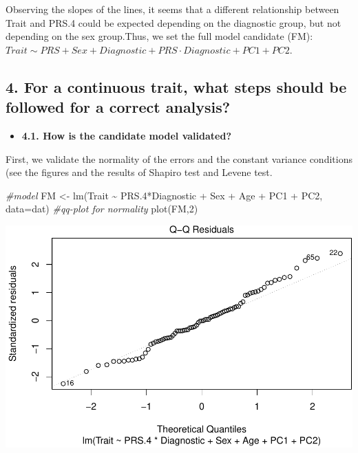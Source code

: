 \documentclass[
]{article}
\newenvironment{Shaded}{\begin{snugshade}}{\end{snugshade}}
\newcommand{\AttributeTok}[1]{\textcolor[rgb]{0.77,0.63,0.00}{#1}}
\newcommand{\CommentTok}[1]{\textcolor[rgb]{0.56,0.35,0.01}{\textit{#1}}}
\newcommand{\DecValTok}[1]{\textcolor[rgb]{0.00,0.00,0.81}{#1}}
\newcommand{\FloatTok}[1]{\textcolor[rgb]{0.00,0.00,0.81}{#1}}
\newcommand{\FunctionTok}[1]{\textcolor[rgb]{0.00,0.00,0.00}{#1}}
\newcommand{\NormalTok}[1]{#1}
\newcommand{\OtherTok}[1]{\textcolor[rgb]{0.56,0.35,0.01}{#1}}
\newcommand{\SpecialCharTok}[1]{\textcolor[rgb]{0.00,0.00,0.00}{#1}}
\providecommand{\tightlist}{%
  \setlength{\itemsep}{0pt}\setlength{\parskip}{0pt}}
\begin{document}
Observing the slopes of the lines, it seems that a different
relationship between Trait and PRS.4 could be expected depending on the
diagnostic group, but not depending on the sex group.Thus, we set the
full model candidate (FM):
\(Trait \sim PRS + Sex + Diagnostic + PRS\cdot Diagnostic + PC1 +PC2\).

\hypertarget{for-a-continuous-trait-what-steps-should-be-followed-for-a-correct-analysis}{%
\subsection{4. For a continuous trait, what steps should be followed for
a correct
analysis?}\label{for-a-continuous-trait-what-steps-should-be-followed-for-a-correct-analysis}}

\begin{itemize}
\tightlist
\item
  \textbf{4.1. How is the candidate model validated?}
\end{itemize}

First, we validate the normality of the errors and the constant variance
conditions (see the figures and the results of Shapiro test and Levene
test.

\begin{Shaded}
\begin{Highlighting}[]
\CommentTok{\#model}
\NormalTok{FM }\OtherTok{\textless{}{-}} \FunctionTok{lm}\NormalTok{(Trait }\SpecialCharTok{\textasciitilde{}}\NormalTok{ PRS}\FloatTok{.4}\SpecialCharTok{*}\NormalTok{Diagnostic }\SpecialCharTok{+}\NormalTok{ Sex }\SpecialCharTok{+}\NormalTok{ Age }\SpecialCharTok{+}\NormalTok{ PC1 }\SpecialCharTok{+}\NormalTok{ PC2, }\AttributeTok{data=}\NormalTok{dat)}
\CommentTok{\#qq{-}plot for normality }
\FunctionTok{plot}\NormalTok{(FM,}\DecValTok{2}\NormalTok{)   }
\end{Highlighting}
\end{Shaded}

\includegraphics{WorkingExample1_code_files/figure-latex/unnamed-chunk-7-1.pdf}
\end{document}
